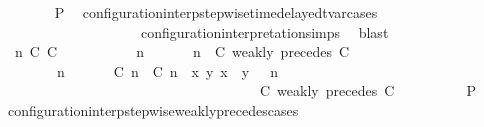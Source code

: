 \begin{isabellebody}
\ \ \ \ \ \ \isamarkupfalse%
\ {\isacharquery}P\ \isamarkupfalse%
\ configuration{\isacharunderscore}interp{\isacharunderscore}stepwise{\isacharunderscore}timedelayed{\isacharunderscore}tvar{\isacharunderscore}cases\isanewline
\ \ \ \ \ \ \ \ \ \ \ \ \ \ \ \ \ \ \ \ configuration{\isacharunderscore}interpretation{\isachardot}simps\ \isamarkupfalse%
\ blast\isanewline
\ \ \ \ \isamarkupfalse%
\isanewline
\ \ \ \ \ \ \isamarkupfalse%
\ {\isasymGamma}\ n\ C\ C\ {\isasymPsi}\ {\isasymPhi}\isanewline
\ \ \ \ \ \ \isamarkupfalse%
\ {\isacartoucheopen}{\isacharparenleft}{\isasymGamma}\ n\ {\isasymturnstile}\ {\isasymPsi}\ {\isasymtriangleright}\ {\isasymPhi}\ {\isacharequal}\ {\isacharparenleft}{\isasymGamma}{\isacharcomma}\ n\ {\isasymturnstile}\ {\isacharparenleft}{\isacharparenleft}C\ weakly\ precedes\ C\ {\isacharhash}\ {\isasymPsi}{\isacharparenright}\ {\isasymtriangleright}\ {\isasymPhi}{\isacharparenright}{\isacartoucheclose}\isanewline
\ \ \ \ \ \ \ {\isacartoucheopen}{\isacharparenleft}{\isasymGamma}\ n\ {\isasymturnstile}\ {\isasymPsi}\ {\isasymtriangleright}\ {\isasymPhi}\ {\isacharequal}\ {\isacharparenleft}{\isacharparenleft}{\isacharparenleft}{\isasymlceil}{\isacharhash}\isactrlsup {\isasymle}\ C\ n{\isacharcomma}\ {\isacharhash}\isactrlsup {\isasymle}\ C\ n{\isasymrceil}\ {\isasymin}\ {\isacharparenleft}{\isasymlambda}{\isacharparenleft}x{\isacharcomma}\ y{\isacharparenright}{\isachardot}\ x\ {\isasymle}\ y{\isacharparenright}{\isacharparenright}\ {\isacharhash}\ {\isasymGamma}{\isacharparenright}{\isacharcomma}\ n\isanewline
\ \ \ \ \ \ \ \ \ \ \ \ \ \ \ \ \ \ \ \ \ \ \ \ \ \ \ \ \ \ \ \ \ \ {\isasymturnstile}\ {\isasymPsi}\ {\isasymtriangleright}\ {\isacharparenleft}{\isacharparenleft}C\ weakly\ precedes\ C\ {\isacharhash}\ {\isasymPhi}{\isacharparenright}{\isacharparenright}{\isacartoucheclose}\isanewline
\ \ \ \ \ \ \isamarkupfalse%
\ {\isacharquery}P\ \isamarkupfalse%
\ configuration{\isacharunderscore}interp{\isacharunderscore}stepwise{\isacharunderscore}weakly{\isacharunderscore}precedes{\isacharunderscore}cases\isanewline

\end{isabellebody}
